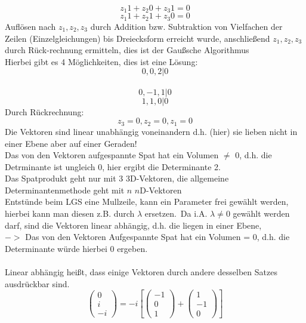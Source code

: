 \documentclass{article}
\begin{document}
\begin{equation*}
    z_1 1+z_2 0 + z_3 1 = 0
\end{equation*}
\begin{equation*}
    z_1 1 +z_2 1 + z_3 0 = 0
\end{equation*}
Auflösen nach $z_1,z_2,z_3$ durch Addition bzw. Subtraktion von Vielfachen der Zeilen (Einzelgleichungen) bis Dreiecksform erreicht wurde, anschließend $z_1,z_2,z_3$ durch Rück-rechnung ermitteln, dies ist der Gaußsche Algorithmus\\
Hierbei gibt es 4 Möglichkeiten, dies ist eine Lösung:\\
\begin{equation*}
    0, 0, 2 | 0
\end{equation*}\
\begin{equation*}
    0, -1, 1 | 0
\end{equation*}
\begin{equation*}
    1, 1, 0 | 0
\end{equation*}
Durch Rückrechnung:
\begin{equation*}
    z_3 = 0, z_2 = 0, z_1 = 0
\end{equation*}
Die Vektoren sind linear unabhängig voneinandern d.h. (hier) sie lieben nicht in einer Ebene aber auf einer Geraden!\\
Das von den Vektoren aufgespannte Spat hat ein Volumen $\neq$ 0, d.h. die Detrminante ist ungleich 0, hier ergibt die Determinante 2.\\
Das Spatprodukt geht nur mit 3 3D-Vektoren, die allgemeine Determinantenmethode geht mit $n$ $n$D-Vektoren\\
Entstünde beim LGS eine Mullzeile, kann ein Parameter frei gewählt werden, hierbei kann man diesen z.B. durch $\lambda$ ersetzen.\
Da i.A. $\lambda \neq 0$ gewählt werden darf, sind die Vektoren linear abhängig, d.h. die liegen in einer Ebene,\\
$->$ Das von den Vektoren Aufgespannte Spat hat ein Volumen = 0, d.h. die Determinante würde hierbei 0 ergeben.\\
\\
Linear abhängig heißt, dass einige Vektoren durch andere desselben Satzes ausdrückbar sind.\\
\begin{equation*}
\left(\begin{array}{c}
    0 \\ i \\ -i
\end{array}\right)=-i\left[\left(\begin{array}{c}
    -1 \\ 0 \\ 1
\end{array}\right)+\left(\begin{array}{c}
    1 \\ -1 \\ 0
\end{array}\right)\right]
\end{equation*}
\end{document}
